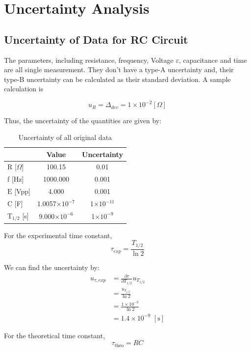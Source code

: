 \documentclass[a4paper]{article}
\begin{document}
\section{Uncertainty Analysis}

\subsection{Uncertainty of Data for RC Circuit}
The parameters, including resistance, frequency, Voltage $\varepsilon$, capacitance and time are all single measurement. They don't have a type-A uncertainty and, their type-B uncertainty can be calculated as their standard deviation. A sample calculation is

$$u_{R} = \Delta_{dev} = 1\times 10^{-2} [\Omega]$$

Thus, the uncertainty of the quantities are given by:
\begin{table}[!htbp]
	\centering
	\begin{tabular}{l c c}
		\hline
		                   & Value                  & Uncertainty        \\
		\hline
		R [$\Omega$]       & 100.15                 & 0.01               \\
		f [Hz]             & 1000.000               & 0.001              \\
		$\mathrm{E}$ [Vpp] & 4.000                  & 0.001              \\
		C [F]              & 1.0057$\times 10^{-7}$ & 1$\times 10^{-11}$ \\
		T$_{1/2}$ [s]      & 9.000$\times 10^{-6}$  & 1$\times 10^{-9}$  \\
		\hline
	\end{tabular}
	\caption{Uncertainty of all original data}
\end{table}

For the experimental time constant,
$$\tau_{exp} = \frac{T_{1/2}}{\ln 2}$$

We can find the uncertainty by:
\begin{align*}
	u_{\tau,exp}
	 & = \frac{\partial \tau}{\partial T_{1/2}}u_{T_{1/2}} \\
	 & = \frac{u_{T_{1/2}}}{\ln 2}                         \\
	 & = \frac{1\times 10^{-9}}{\ln 2}                     \\
	 & = 1.4\times 10^{-9}\,\,[\text{s}]
\end{align*}

For the theoretical time constant,
$$\tau_{\text{theo}} = RC$$
\end{document}
